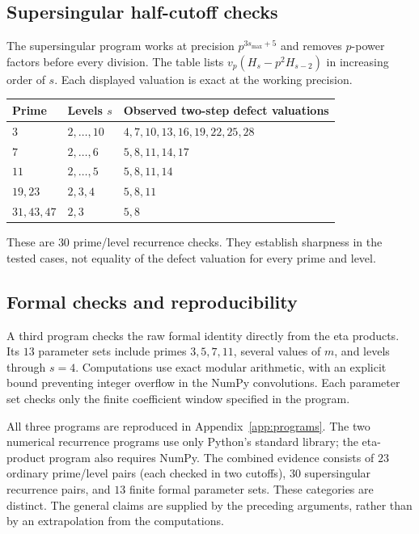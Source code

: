 \documentclass[11pt,a4paper]{article}
\begin{document}
\subsection{Supersingular half-cutoff checks}

The supersingular program works at precision $p^{3s_{\max}+5}$ and
removes $p$-power factors before every division. The table lists
$v_p(H_s-p^2H_{s-2})$ in increasing order of $s$. Each displayed
valuation is exact at the working precision.
\begin{center}
\begin{tabular}{@{}lll@{}}\toprule
Prime & Levels $s$ & Observed two-step defect valuations\\\midrule
$3$ & $2,\ldots,10$ & $4,7,10,13,16,19,22,25,28$\\
$7$ & $2,\ldots,6$ & $5,8,11,14,17$\\
$11$ & $2,\ldots,5$ & $5,8,11,14$\\
$19,23$ & $2,3,4$ & $5,8,11$\\
$31,43,47$ & $2,3$ & $5,8$\\\bottomrule
\end{tabular}
\end{center}
These are $30$ prime/level recurrence checks. They establish sharpness
in the tested cases, not equality of the defect valuation for every
prime and level.

\subsection{Formal checks and reproducibility}

A third program checks the raw formal identity directly from the eta
products. Its $13$ parameter sets include primes $3,5,7,11$, several
values of $m$, and levels through $s=4$. Computations use exact modular
arithmetic, with an explicit bound preventing integer overflow in
the NumPy convolutions. Each parameter set checks only the finite
coefficient window specified in the program.

All three programs are reproduced in Appendix~\ref{app:programs}.
The two numerical recurrence programs use only Python's standard
library; the eta-product program also requires NumPy. The combined
evidence consists of $23$ ordinary prime/level pairs (each checked in
two cutoffs), $30$ supersingular recurrence pairs, and $13$ finite
formal parameter sets. These categories are distinct. The general
claims are supplied by the preceding arguments, rather than by an
extrapolation from the computations.
\end{document}
